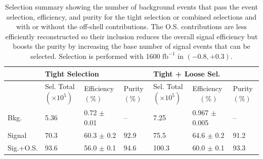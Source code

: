 \begin{table}
\caption{Selection summary showing the number of background events that pass the event selection, efficiency, and purity for the tight selection or combined selections and with or without the off-shell contributions.  The O.S. contributions are less efficiently reconstructed so their inclusion reduces the overall signal efficiency but boosts the purity by increasing the base number of signal events that can be selected. Selection is performed with 1600 $\text{fb}^{-1}$ in $(-0.8, +0.3)$. }
\label{tab:summary}
 \begin{tabular}{ |p{}|p{}p{}|p{}|p{}p{}|p{}|} 
 \hline 
   &  \multicolumn{3}{|l|}{Tight Selection} &  \multicolumn{3}{|l|}{ Tight + Loose Sel.}  \\  \hline  
 & Sel. Total $(\times 10^5)$ & Efficiency $(\%)$ & Purity $(\%)$ & Sel. Total $(\times 10^5)$ & Efficiency $\,\,\,\,$ $(\%)$& Purity $(\%)$ \\ 
 \hline  
 Bkg. &  {5.36} & 0.72 $\pm$ 0.01 & --&  {7.25} & 0.967 $\pm$ 0.005 &--  \\ 
 Signal &  {70.3} & 60.3 $\pm$ 0.2 & 92.9  &  {75.5} & 64.6 $\pm$ 0.2 & 91.2 \\ 
 Sig.+O.S. &  {93.6} & 56.0 $\pm$ 0.1 & 94.6 &  {100.3} & 60.0 $\pm$ 0.1 & 93.3 \\ 
\hline 
\end{tabular} 
\end{table}

